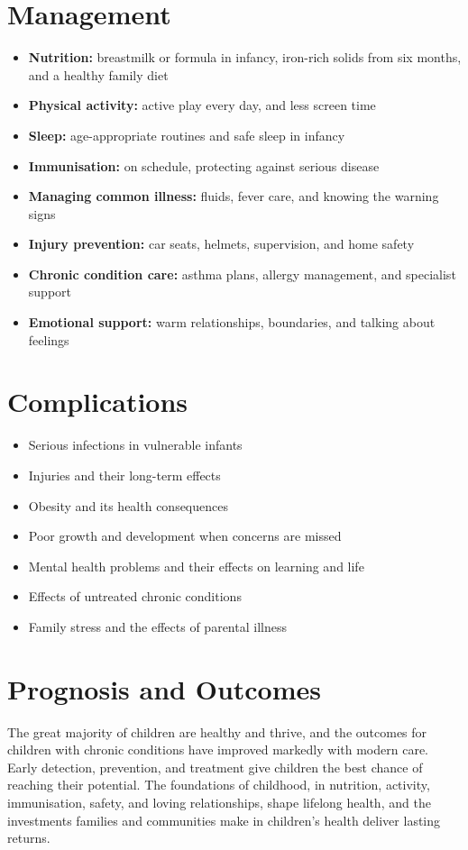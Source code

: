 \section*{Management}
\begin{itemize}
    \item \textbf{Nutrition:} breastmilk or formula in infancy, iron-rich solids from six months, and a healthy family diet
    \item \textbf{Physical activity:} active play every day, and less screen time
    \item \textbf{Sleep:} age-appropriate routines and safe sleep in infancy
    \item \textbf{Immunisation:} on schedule, protecting against serious disease
    \item \textbf{Managing common illness:} fluids, fever care, and knowing the warning signs
    \item \textbf{Injury prevention:} car seats, helmets, supervision, and home safety
    \item \textbf{Chronic condition care:} asthma plans, allergy management, and specialist support
    \item \textbf{Emotional support:} warm relationships, boundaries, and talking about feelings
\end{itemize}

\section*{Complications}
\begin{itemize}
    \item Serious infections in vulnerable infants
    \item Injuries and their long-term effects
    \item Obesity and its health consequences
    \item Poor growth and development when concerns are missed
    \item Mental health problems and their effects on learning and life
    \item Effects of untreated chronic conditions
    \item Family stress and the effects of parental illness
\end{itemize}

\section*{Prognosis and Outcomes}
The great majority of children are healthy and thrive, and the outcomes for children with chronic conditions have improved markedly with modern care. Early detection, prevention, and treatment give children the best chance of reaching their potential. The foundations of childhood, in nutrition, activity, immunisation, safety, and loving relationships, shape lifelong health, and the investments families and communities make in children's health deliver lasting returns.

